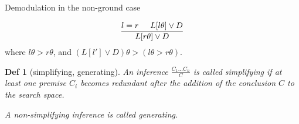 \documentclass[]{article}
\newtheorem*{definition*}{Def}
\begin{document}
Demodulation in the non-ground case

\begin{align*}
	\frac{l=r \hspace{.5cm} L[l\theta] \lor D}{L[r\theta] \lor D}
\end{align*}
where $l\theta > r\theta$, and $(L[l']\lor D)\theta > (l\theta > r\theta)$.

\begin{definition*}[simplifying, generating]
	An inference $\frac{C_1 ... C_n}{C}$ is called simplifying if at least one premise $C_i$ becomes redundant after the addition of the conclusion $C$ to the search space.
	
	A non-simplifying inference is called generating.
\end{definition*}
\end{document}
